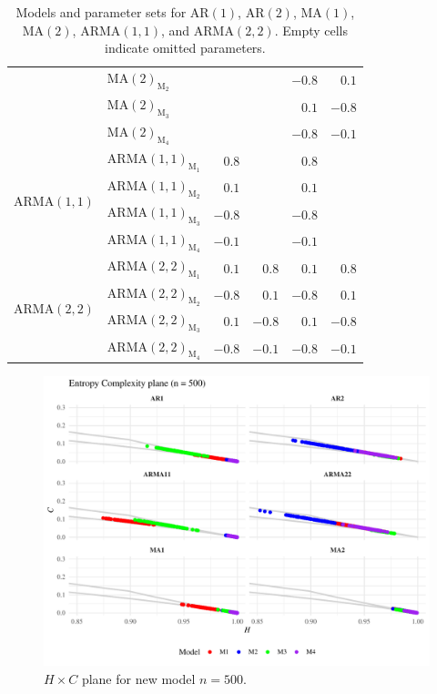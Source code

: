 \documentclass[11pt,a4paper]{article}
\begin{document}
\begin{table}[hbt]
\begin{tabular}{llrrrr}
		& $\mathrm{MA}(2)_{\textrm{M}_2}$  &       &      & $-0.8$ & $0.1$  \\
		& $\mathrm{MA}(2)_{\textrm{M}_3}$  &       &      & $0.1$  & $-0.8$ \\
		& $\mathrm{MA}(2)_{\textrm{M}_4}$  &       &      & $-0.8$ & $-0.1$ \\
		\midrule
		\multirow{4}[2]{*}{$\mathrm{ARMA}(1,1)$}  & $\mathrm{ARMA}(1,1)_{\textrm{M}_1}$ & $0.8$ &      & $0.8$  &      \\
		& $\mathrm{ARMA}(1,1)_{\textrm{M}_2}$ & $0.1$ &      & $0.1$  &      \\
		& $\mathrm{ARMA}(1,1)_{\textrm{M}_3}$ & $-0.8$ &     & $-0.8$ &      \\
		& $\mathrm{ARMA}(1,1)_{\textrm{M}_4}$ & $-0.1$ &     & $-0.1$ &      \\
		\midrule
		\multirow{4}[2]{*}{$\mathrm{ARMA}(2,2)$}  & $\mathrm{ARMA}(2,2)_{\textrm{M}_1}$ & $0.1$ & $0.8$  & $0.1$  & $0.8$  \\
		& $\mathrm{ARMA}(2,2)_{\textrm{M}_2}$ & $-0.8$ & $0.1$ & $-0.8$ & $0.1$  \\
		& $\mathrm{ARMA}(2,2)_{\textrm{M}_3}$ & $0.1$ & $-0.8$ & $0.1$  & $-0.8$ \\
		& $\mathrm{ARMA}(2,2)_{\textrm{M}_4}$ & $-0.8$ & $-0.1$ & $-0.8$ & $-0.1$ \\
		\bottomrule
	\end{tabular}
	\caption{Models and parameter sets for $\mathrm{AR}(1)$, $\mathrm{AR}(2)$, $\mathrm{MA}(1)$, $\mathrm{MA}(2)$, $\mathrm{ARMA}(1,1)$, and $\mathrm{ARMA}(2,2)$. Empty cells indicate omitted parameters.}
	\label{table:summary}
\end{table}


\begin{figure}[H]
	\includegraphics[width=0.8 \textwidth]{New_model_group_plot_n500}
	\caption{$H \times C$ plane for new model $n=500$.}
	\label{fig:HC new n500}
\end{figure}
\end{document}
